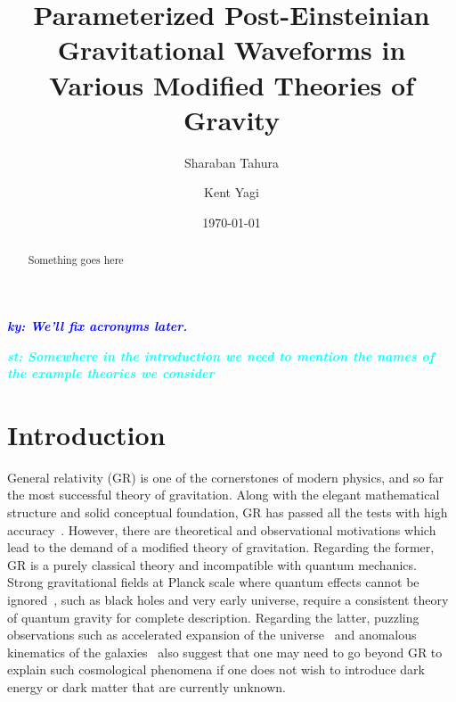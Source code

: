\documentclass[prd,twocolumn,nofootinbib]{revtex4-1}
\newcommand{\ky}[1]{\textcolor{blue}{\it{\textbf{ky: #1}}} }
\newcommand{\st}[1]{\textcolor{cyan}{\it{\textbf{st: #1}}} }
\begin{document}
\title{Parameterized Post-Einsteinian Gravitational Waveforms in \\ Various Modified Theories of Gravity}

\author{Sharaban Tahura}

\author{Kent Yagi}

\begin{abstract} 

Something goes here 
\end{abstract}

\date{\today}




\maketitle





\ky{We'll fix acronyms later.}

\st{Somewhere in the introduction we need to mention the names of the example theories we consider}

\section{Introduction}
General relativity (GR) is one of the cornerstones of modern physics, and so far the most  successful theory of gravitation. Along with the elegant mathematical structure and solid conceptual foundation, GR has passed all the tests with high accuracy~\cite{Will:2014kxa}. However, there are theoretical and observational motivations which lead to the demand of a modified theory of gravitation. Regarding the former, GR is a purely classical theory and incompatible with quantum mechanics. Strong gravitational fields at Planck scale where quantum effects cannot be ignored~\cite{Adler:2010wf,Ng:2003jk}, such as black holes and very early universe, require a consistent theory of quantum gravity for complete description. Regarding the latter, puzzling observations such as accelerated expansion of the universe~\cite{Abbott:1988nx,Copeland:2006wr,Perlmutter:1998np,Riess:1998cb,Riess:2004nr,RevModPhys.61.1,vanAlbada:1984js,WEINBERG201387} and anomalous kinematics of the galaxies~\cite{article,Bosma:1981zz,Begeman:1991iy,Rubin:1970zza,Rubin:1980zd,1973ApJ...186..467O,Ostriker:1993fr} also suggest that one may need to go beyond GR to explain such cosmological phenomena if one does not wish to introduce dark energy or dark matter that are currently unknown.
\end{document}
